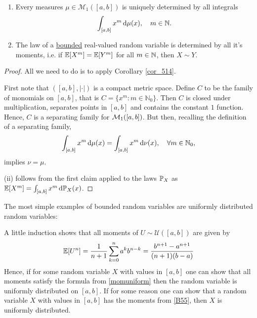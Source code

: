 \begin{lsuperwichtigersatz}
\begin{theorem}\label{coruniq}
	\begin{enumerate}[label=(\roman*)]
		\item Every measures $\mu\in \mathcal M_1([a,b])$ is uniquely determined by all integrals $$\int_{[a,b]} x^m \dint \mu(x),\quad m\in\N.$$
		\item The law of a \underline{bounded} real-valued random variable is determined by all it's moments, i.e. if $\E[X^m]=\E[Y^m]$ for all $m\in\N$, then $X\sim Y$.

	\end{enumerate}
\end{theorem}
\end{lsuperwichtigersatz}
\begin{proof}[Proof] All we need to do is to apply Corollary \ref{cor_514}.\smallskip

First note that $([a,b],|\cdot|)$ is a compact metric space. Define $C$ to be the family of monomials on $[a,b]$, that is $C = \{ x^m \colon m \in \mathbb{N}_0 \}$. Then $C$ is closed under multiplication, separates points in $[a,b]$ and contains the constant $1$ function. Hence, $C$ is a separating family for $\cM_1([a,b])$. But then, recalling the definition of a separating family,
\begin{align*}
	\int_{[a,b]} x^m \dint \mu(x)=\int_{[a,b]} x^m \dint \nu(x),\quad \forall m\in\N_0,
\end{align*}
implies $\nu=\mu$.\smallskip

(ii) follows from the first claim applied to the laws $\P_X$ as $\E[X^m]=\int_{[a,b]}x^m\dint \P_X(x)$.
\end{proof}
The most simple examples of bounded random variables are uniformly distributed random variables:
\begin{luebung}
	A little induction shows that all moments of $U\sim \mathcal U([a,b])$ are given by 
	\begin{align}\label{momuniform}
		\E[U^n]=\frac{1}{n+1}\sum_{k=0}^na^kb^{n-k}=\frac{b^{n+1}-a^{n+1}}{(n+1)(b-a)}	
	\end{align}
	Hence, if for some random variable $X$ with values in $[a,b]$ one can show that all moments satisfy the formula from \eqref{momuniform} then the random variable is uniformly distributed on $[a,b]$. If for some reason one can show that a random variable $X$ with values in $[a,b]$ has the moments from \eqref{B55}, then $X$ is uniformly distributed. \smallskip

\end{luebung}

